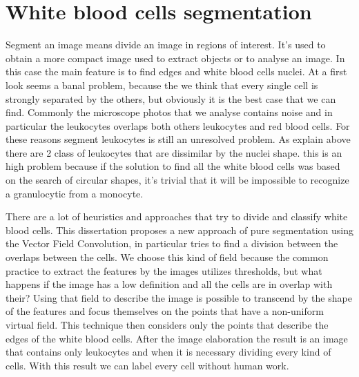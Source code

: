 \section*{White blood cells segmentation}
Segment an image means divide an image in regions of interest. It's used to obtain a more compact image used to extract objects or to analyse an image. In this case the main feature is to find edges and white blood cells nuclei. At a first look seems a banal problem, because the we think that every single cell is strongly separated by the others, but obviously it is the best case that we can find. Commonly the microscope photos that we analyse contains noise and in particular the leukocytes overlaps both others leukocytes and red blood cells. For these reasons segment leukocytes is still an unresolved problem. As explain above there are 2 class of leukocytes that are dissimilar by the nuclei shape. this is an high problem because if the solution to find all the white blood cells was based on the search of circular shapes, it's trivial that it will be impossible to recognize a granulocytic from a monocyte.


There are a lot of heuristics and approaches that try to divide and classify white blood cells. This dissertation proposes a new approach of pure segmentation using the Vector Field Convolution, in particular tries to find a division between the overlaps between the cells. We choose this kind of field because the common practice to extract the features by the images utilizes thresholds, but what happens if the image has a low definition and all the cells are in overlap with their? Using that field to describe the image is possible to transcend by the shape of the features and focus themselves on the points that have a non-uniform virtual field. This technique then considers only the points that describe the edges of the white blood cells. After the image elaboration the result is an image that contains only leukocytes and when it is necessary dividing every kind of cells. With this result we can label every cell without human work.
